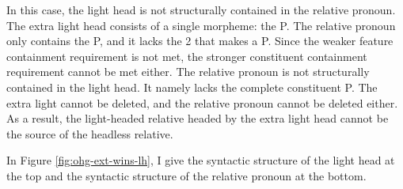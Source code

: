 In this case, the light head is not structurally contained in the relative pronoun.
The extra light head consists of a single morpheme: the P.
The relative pronoun only contains the P, and it lacks the 2 that makes a P. Since the weaker feature containment requirement is not met, the stronger constituent containment requirement cannot be met either.
The relative pronoun is not structurally contained in the light head. It namely lacks the complete constituent P.
The extra light cannot be deleted, and the relative pronoun cannot be deleted either.
As a result, the light-headed relative headed by the extra light head cannot be the source of the headless relative.

In Figure \ref{fig:ohg-ext-wins-lh}, I give the syntactic structure of the light head at the top and the syntactic structure of the relative pronoun at the bottom.

